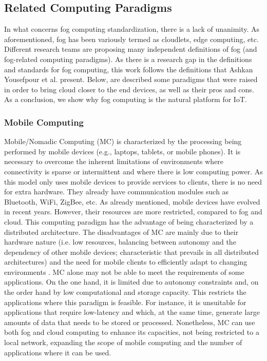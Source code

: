 \subsection{Related Computing Paradigms}
\label{sec:Computingparadigms}
In what concerns fog computing standardization, there is a lack of unanimity. As aforementioned, fog has been variously termed as cloudlets, edge computing, etc. Different research teams are proposing many independent definitions of fog (and fog-related computing paradigms). As there is a research gap in the definitions and standards for fog computing, this work follows the definitions that Ashkan Yousefpour et al. \cite{yousefpour2018all} present. Below, are described some paradigms that were raised in order to bring cloud closer to the end devices, as well as their pros and cons. As a conclusion, we show why fog computing is the natural platform for IoT.

\subsubsection{Mobile Computing}\label{subsec:MC}
Mobile/Nomadic Computing (MC) is characterized by the processing being performed by mobile devices (e.g., laptops, tablets, or mobile phones). It is necessary to overcome the inherent limitations of environments where connectivity is sparse or intermittent and where there is low computing power. As this model only uses mobile devices to provide services to clients, there is no need for extra hardware. They already have communication modules such as Bluetooth, WiFi, ZigBee, etc. As already mentioned, mobile devices have evolved in recent years. However, their resources are more restricted, compared to fog and cloud. This computing paradigm has the advantage of being characterized by a distributed architecture. The disadvantages of MC are mainly due to their hardware nature (i.e. low resources, balancing between autonomy and the dependency of other mobile devices; characteristic that prevails in all distributed architectures) and the need for mobile clients to efficiently adapt to changing environments \cite{satyanarayanan1996fundamental}. MC alone may not be able to meet the requirements of some applications. On the one hand, it is limited due to autonomy constraints and, on the order hand by low computational and storage capacity. This restricts the applications where this paradigm is feasible. For instance, it is unsuitable for applications that require low-latency and which, at the same time, generate large amounts of data that needs to be stored or processed. Nonetheless, MC can use both fog and cloud computing to enhance its capacities, not being restricted to a local network, expanding the scope of mobile computing and the number of applications where it can be used.

